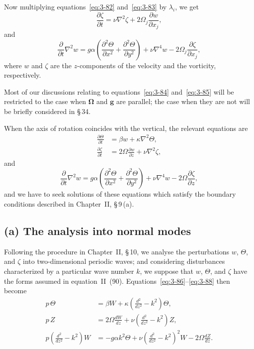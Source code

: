Now multiplying equations~\eqref{eq:3-82} and~\eqref{eq:3-83} by $\lambda_i$, we get
\begin{equation}\label{eq:3-84}
\frac{\partial\zeta}{\partial t} = \nu\nabla^2\zeta + 2\Omega_j\frac{\partial w}{\partial x_j},
\end{equation}
and
\begin{equation}\label{eq:3-85}
\frac{\partial}{\partial t}\nabla^2 w = g\alpha\!\left(\frac{\partial^2\Theta}{\partial x^2}+\frac{\partial^2\Theta}{\partial y^2}\right) + \nu\nabla^4 w - 2\Omega_j\frac{\partial\zeta}{\partial x_j},
\end{equation}
where $w$ and $\zeta$ are the $z$-components of the velocity and the vorticity, respectively.

Most of our discussions relating to equations~\eqref{eq:3-84} and~\eqref{eq:3-85} will be restricted to the case when $\boldsymbol{\Omega}$ and $\mathbf{g}$ are parallel; the case when they are not will be briefly considered in \S\,34.

When the axis of rotation coincides with the vertical, the relevant equations are
\begin{align}
\frac{\partial\Theta}{\partial t} &= \beta w + \kappa\nabla^2\Theta, \label{eq:3-86}\\[4pt]
\frac{\partial\zeta}{\partial t} &= 2\Omega\frac{\partial w}{\partial z} + \nu\nabla^2\zeta, \label{eq:3-87}
\end{align}
and
\begin{equation}\label{eq:3-88}
\frac{\partial}{\partial t}\nabla^2 w = g\alpha\!\left(\frac{\partial^2\Theta}{\partial x^2}+\frac{\partial^2\Theta}{\partial y^2}\right) + \nu\nabla^4 w - 2\Omega\frac{\partial\zeta}{\partial z},
\end{equation}
and we have to seek solutions of these equations which satisfy the boundary conditions described in Chapter~II, \S\,9\,(a).

\subsection*{(a) The analysis into normal modes}

Following the procedure in Chapter~II, \S\,10, we analyse the perturbations $w$, $\Theta$, and $\zeta$ into two-dimensional periodic waves; and considering disturbances characterized by a particular wave number $k$, we suppose that $w$, $\Theta$, and $\zeta$ have the forms assumed in equation~II~(90). Equations~\eqref{eq:3-86}--\eqref{eq:3-88} then become
\begin{align}
p\,\Theta &= \beta W + \kappa\!\left(\frac{d^2}{dz^2}-k^2\right)\!\Theta, \label{eq:3-89}\\[4pt]
p\,Z &= 2\Omega\frac{dW}{dz} + \nu\!\left(\frac{d^2}{dz^2}-k^2\right)\!Z, \label{eq:3-90}\\[4pt]
p\!\left(\frac{d^2}{dz^2}-k^2\right)\!W &= -g\alpha k^2\Theta + \nu\!\left(\frac{d^2}{dz^2}-k^2\right)^{\!2}\!W - 2\Omega\frac{dZ}{dz}. \label{eq:3-91}
\end{align}

